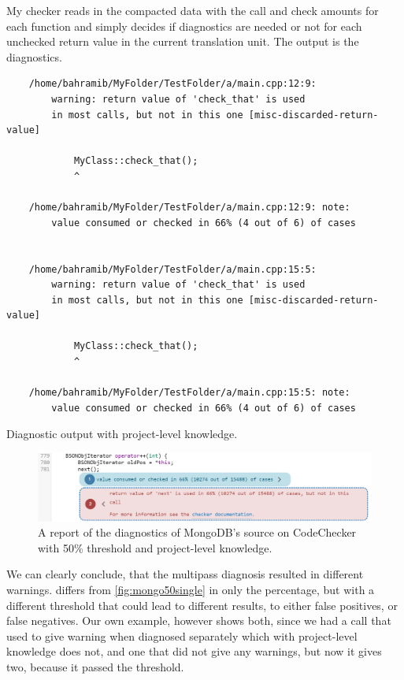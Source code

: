 My checker reads in the compacted data with the call and check amounts for each function and simply decides
if diagnostics are needed or not for each unchecked return value in the current translation unit.
The output is the diagnostics.

\begin{listing}[H]
	\begin{verbatim}
	/home/bahramib/MyFolder/TestFolder/a/main.cpp:12:9:
		warning: return value of 'check_that' is used
		in most calls, but not in this one [misc-discarded-return-value]

			MyClass::check_that();
			^

	/home/bahramib/MyFolder/TestFolder/a/main.cpp:12:9: note:
		value consumed or checked in 66% (4 out of 6) of cases


	/home/bahramib/MyFolder/TestFolder/a/main.cpp:15:5:
		warning: return value of 'check_that' is used
		in most calls, but not in this one [misc-discarded-return-value]

			MyClass::check_that();
			^

	/home/bahramib/MyFolder/TestFolder/a/main.cpp:15:5: note:
		value consumed or checked in 66% (4 out of 6) of cases
	\end{verbatim}
	\caption{Diagnostic output with project-level knowledge.}
\end{listing}



\begin{figure}[H]
	\includegraphics[width=\linewidth]{images/codechecker_first_ss_mongo_multi_50.png}
	\caption{A report of the diagnostics of MongoDB's source on CodeChecker with 50\% threshold and project-level knowledge.}
	\label{fig:mongo50multi}
\end{figure}

We can clearly conclude, that the multipass diagnosis resulted in different warnings. 
differs from \cref{fig:mongo50single} in only the percentage, but with a different threshold that could lead to different
results, to either false positives, or false negatives. Our own example, however shows both, since we had a call
that used to give warning when diagnosed separately which with project-level knowledge does not, and one that did not give
any warnings, but now it gives two, because it passed the threshold.

